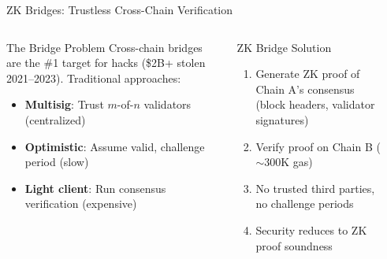 \documentclass[8pt,aspectratio=169]{beamer}
\begin{document}
\begin{frame}{ZK Bridges: Trustless Cross-Chain Verification}
\begin{columns}[T]
\begin{block}{\footnotesize The Bridge Problem}
\footnotesize
Cross-chain bridges are the \#1 target for hacks (\$2B+ stolen 2021--2023). Traditional approaches:
\begin{itemize}
\item \textbf{Multisig}: Trust $m$-of-$n$ validators (centralized)
\item \textbf{Optimistic}: Assume valid, challenge period (slow)
\item \textbf{Light client}: Run consensus verification (expensive)
\end{itemize}
\end{block}
\vspace{0.1cm}
\begin{exampleblock}{\footnotesize ZK Bridge Solution}
\footnotesize
\begin{enumerate}
\item Generate ZK proof of Chain A's consensus (block headers, validator signatures)
\item Verify proof on Chain B ($\sim$300K gas)
\item No trusted third parties, no challenge periods
\item Security reduces to ZK proof soundness
\end{enumerate}
\end{exampleblock}
\begin{center}
\end{center}
\end{columns}
\end{frame}
\end{document}
